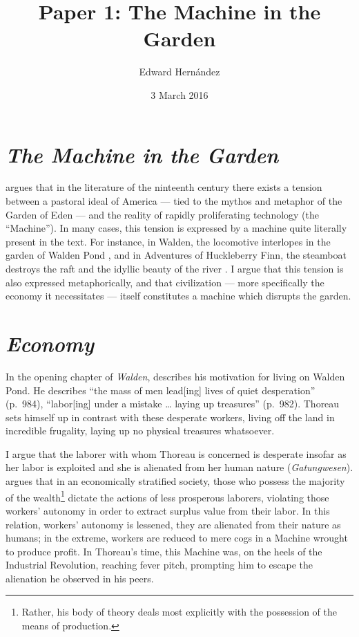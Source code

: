 \documentclass[man,12pt,natbib]{apa6}
\begin{document}
\title{Paper 1: The Machine in the Garden}
\author{Edward Hern\'{a}ndez}
\date{3 March 2016}
\maketitle

\section{\emph{The Machine in the Garden}}

\citet{Marx64} argues that in the literature of the ninteenth century there
exists a tension between a pastoral ideal of America --- tied to the mythos and
metaphor of the Garden of Eden --- and the reality of rapidly proliferating
technology (the ``Machine''). In many cases, this tension is expressed by a
machine quite literally present in the text. For instance, in Walden, the
locomotive interlopes in the garden of Walden Pond \citep[ch.~4]{Thoreau12},
and in Adventures of Huckleberry Finn, the steamboat destroys the raft and the
idyllic beauty of the river \citep[ch.~16]{Twain85}.  I argue that this tension
is also expressed metaphorically, and that civilization --- more specifically
the economy it necessitates --- itself constitutes a machine which disrupts the
garden.


\section{\emph{Economy}}

In the opening chapter of \emph{Walden}, \citet{Thoreau12} describes his
motivation for living on Walden Pond. He describes ``the mass of men lead[ing]
lives of quiet desperation'' (p.~984), ``labor[ing] under a mistake \dots{}
laying up treasures'' (p.~982).  Thoreau sets himself up in contrast with these
desperate workers, living off the land in incredible frugality, laying up no
physical treasures whatsoever.

I argue that the laborer with whom Thoreau is concerned is desperate insofar as
her labor is exploited and she is alienated from her human nature
(\emph{Gatungwesen}). \citet{Marx44} argues that in an economically stratified
society, those who possess the majority of the wealth\footnote{Rather, his body
of theory deals most explicitly with the possession of the means of
production.} dictate the actions of less prosperous laborers, violating those
workers' autonomy in order to extract surplus value from their labor. In this
relation, workers' autonomy is lessened, they are alienated from their nature
as humans; in the extreme, workers are reduced to mere cogs in a Machine
wrought to produce profit. In Thoreau's time, this Machine was, on the heels of
the Industrial Revolution, reaching fever pitch, prompting him to escape the
alienation he observed in his peers.
\end{document}
